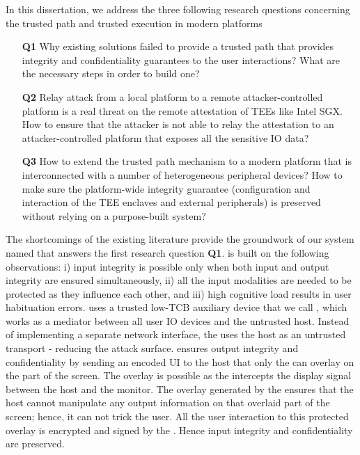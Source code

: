 In this dissertation, we address the three following research questions concerning the trusted path and trusted execution in modern platforms 
\begin{enumerate}
    \item[\textbf{Q1}] Why existing solutions failed to provide a trusted path that provides integrity and confidentiality guarantees to the user interactions? What are the necessary steps in order to build one?
    
    \item[\textbf{Q2}] Relay attack from a local platform to a remote attacker-controlled platform is a real threat on the remote attestation of TEEs like Intel SGX. How to ensure that the attacker is not able to relay the attestation to an attacker-controlled platform that exposes all the sensitive IO data?
    
    \item[\textbf{Q3}] How to extend the trusted path mechanism to a modern platform that is interconnected with a number of heterogeneous peripheral devices? How to make sure the platform-wide integrity guarantee (configuration and interaction of the TEE enclaves and external peripherals) is preserved without relying on a purpose-built system?  
\end{enumerate}


The shortcomings of the existing literature provide the groundwork of our system named \protection that answers the first research question \textbf{Q1}.
\protection is built on the following observations: i) input integrity is possible only when both input and output integrity are ensured simultaneously, ii) all the input modalities are needed to be protected as they influence each other, and iii) high cognitive load results in user habituation errors. \protection uses a trusted low-TCB auxiliary device that we call \deviceprotection, which works as a mediator between all user IO devices and the untrusted host. Instead of implementing a separate network interface, the \deviceprotection uses the host as an untrusted transport - reducing the attack surface. \protection ensures output integrity and confidentiality by sending an encoded UI to the host that only the \deviceprotection can overlay on the part of the screen. The overlay is possible as the \deviceprotection intercepts the display signal between the host and the monitor. The overlay generated by the \deviceprotection ensures that the host cannot manipulate any output information on that overlaid part of the screen; hence, it can not trick the user. All the user interaction to this protected overlay is encrypted and signed by the \deviceprotection. Hence input integrity and confidentiality are preserved.


